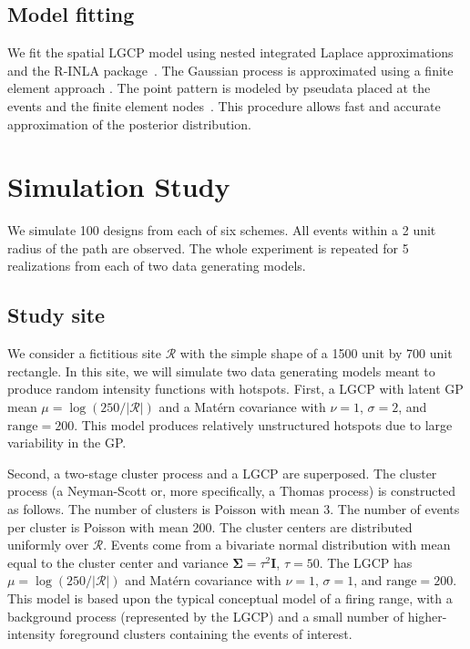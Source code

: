 \documentclass[review]{elsarticle}
\begin{document}


\subsection{Model fitting}

We fit the spatial LGCP model using nested integrated Laplace approximations
and the R-INLA package~\citep{rueetal,rinla}. The Gaussian process is
approximated using a finite element approach \citep{lindgrenetal}. The point
pattern is modeled by pseudata placed at the events and the finite element
nodes~\citep{simpsonetal}. This procedure allows fast and accurate
approximation of the posterior distribution.%


\section{Simulation Study}

We simulate 100 designs from each of six schemes. All events within a 2 unit
radius of the path are observed. The whole experiment is repeated for 5
realizations from each of two data generating models.


\subsection{Study site}

We consider a fictitious site \(\mathcal{R}\) with the simple shape of a 1500
unit by 700 unit rectangle. In this site, we will simulate two data generating
models meant to produce random intensity functions with hotspots. First, a LGCP
with latent GP mean \(\mu = \log(250 / |\mathcal{R}|)\) and a Mat\'{e}rn
covariance with \(\nu = 1\), \(\sigma = 2\), and \(\text{range} = 200\). This
model produces relatively unstructured hotspots due to large variability in the
GP.

Second, a two-stage cluster process and a LGCP are superposed. The cluster
process (a Neyman-Scott or, more specifically, a Thomas process) is constructed
as follows. The number of clusters is Poisson with mean 3. The number of events
per cluster is Poisson with mean 200. The cluster centers are distributed
uniformly over \(\mathcal{R}\). Events come from a bivariate normal
distribution with mean equal to the cluster center and variance
\(\boldsymbol{\Sigma} = \tau^{2}\mathbf{I}\), \(\tau = 50\). The LGCP has
\(\mu = \log(250 / |\mathcal{R}|)\) and Mat\'{e}rn covariance with \(\nu = 1\),
\(\sigma = 1\), and \(\text{range} = 200\). This model is based upon the
typical conceptual model of a firing range, with a background process
(represented by the LGCP) and a small number of higher-intensity foreground
clusters containing the events of interest.
\end{document}
